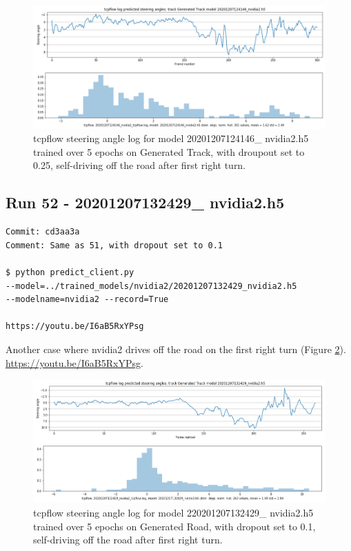 \begin{figure}[ht]
 \centering 
 \includegraphics[width=\textwidth]{Figures/20201207124146_nvidia2_tcpflow.png}
 \caption{tcpflow steering angle log for model 20201207124146\_ nvidia2.h5 trained over 5 epochs on Generated Track, with droupout set to 0.25, self-driving off the road after first right turn.}
 \label{fig:20201207124146_nvidia2_tcpflow}
\end{figure}


\subsection{Run 52 - 20201207132429\_ nvidia2.h5}
\label{app_res:52}
\begin{verbatim}
Commit: cd3aa3a
Comment: Same as 51, with dropout set to 0.1

$ python predict_client.py 
--model=../trained_models/nvidia2/20201207132429_nvidia2.h5 
--modelname=nvidia2 --record=True

https://youtu.be/I6aB5RxYPsg

\end{verbatim}

Another case where nvidia2 drives off the road on the first right turn (Figure \ref{fig:20201207132429_nvidia2_tcpflow}). \url{https://youtu.be/I6aB5RxYPsg}.
\begin{figure}[ht]
 \centering 
 \includegraphics[width=\textwidth]{Figures/20201207132429_nvidia2_tcpflow.png}
 \caption{tcpflow steering angle log for model 220201207132429\_ nvidia2.h5 trained over 5 epochs on Generated Road, with dropout set to 0.1, self-driving off the road after first right turn.}
 \label{fig:20201207132429_nvidia2_tcpflow}
\end{figure}

